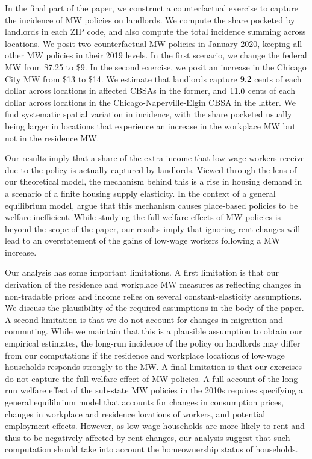 
In the final part of the paper, we construct a counterfactual exercise to 
capture the incidence of MW policies on landlords.
We compute the share pocketed by landlords in each ZIP code, and also
compute the total incidence summing across locations.
We posit two counterfactual MW policies in January 2020, keeping all other
MW policies in their 2019 levels.
In the first scenario, we change the federal MW from \$7.25 to \$9.
In the second exercise, we posit an increase in the Chicago City MW 
from \$13 to \$14.
We estimate that landlords capture $\textnormal{9.2}$ cents of each 
dollar across locations in affected CBSAs in the former, and 
$\textnormal{11.0}$ cents of each dollar across locations in the 
Chicago-Naperville-Elgin CBSA in the latter.
We find systematic spatial variation in incidence,
with the share pocketed usually being larger in locations that experience an
increase in the workplace MW but not in the residence MW.

Our results imply that a share of the extra income that low-wage workers
receive due to the policy is actually captured by landlords.
Viewed through the lens of our theoretical model,
the mechanism behind this is a rise in housing demand in a scenario of a 
finite housing supply elasticity.
In the context of a general equilibrium model, \textcite{KlineMoretti2014} argue
that this mechanism causes place-based policies to be welfare inefficient.
While studying the full welfare effects of MW policies is beyond the scope of 
the paper, our results imply that ignoring rent changes will lead to an 
overstatement of the gains of low-wage workers following a MW increase.

Our analysis has some important limitations.
A first limitation is that our derivation of the residence and workplace MW
measures as reflecting changes in non-tradable prices and income relies on 
several constant-elasticity assumptions.
We discuss the plausibility of the required assumptions in the body of the paper.
A second limitation is that we do not account for changes in migration and 
commuting.
While we maintain that this is a plausible assumption to obtain our empirical 
estimates, the long-run incidence of the policy on landlords may differ from our 
computations if the residence and workplace locations of low-wage households 
responds strongly to the MW.
A final limitation is that our exercises do not capture the full welfare 
effect of MW policies.
A full account of the long-run welfare effect of the sub-state MW policies in 
the 2010s requires specifying a general equilibrium model that accounts for 
changes in consumption prices, changes in workplace and residence locations
of workers, and potential employment effects.
However, as low-wage households are more likely to rent and thus to be 
negatively affected by rent changes, our analysis suggest that such computation 
should take into account the homeownership status of households.

